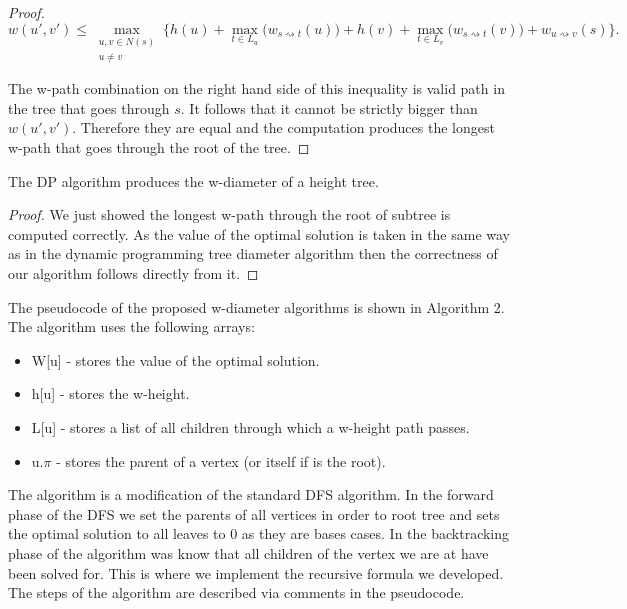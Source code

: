 \begin{proof}
   $$ w(u', v') \le \max\limits_{\substack{u, v \in N(s) \\ u \ne v}}\{ h(u) + \max\limits_{t \in L_u}\Big(w_{s \rightsquigarrow t}(u)\Big) + h(v) + \max\limits_{t \in L_v}\Big(w_{s \rightsquigarrow t}(v)\Big) + w_{u \rightsquigarrow v}(s)\}. $$

   The w-path combination on the right hand side of this inequality is valid path in the tree that goes through $s$. It follows that it cannot be strictly bigger than $w(u', v')$. Therefore they are equal and the computation produces the longest w-path that goes through the root of the tree.

   \end{proof}

\begin{lem} The DP algorithm produces the w-diameter of a height tree. \end{lem}

\begin{proof}

   We just showed the longest w-path through the root of subtree is computed correctly. As the value of the optimal solution is taken in the same way as in the dynamic programming tree diameter algorithm then the correctness of our algorithm follows directly from it.

\end{proof}

The pseudocode of the proposed w-diameter algorithms is shown in Algorithm 2. The algorithm uses the following arrays:

\begin{itemize}
    \item W[u] - stores the value of the optimal solution.
    \item h[u] - stores the w-height.
    \item L[u] - stores a list of all children through which a w-height path passes.
    \item u.$\pi$ - stores the parent of a vertex (or itself if is the root).
\end{itemize}

The algorithm is a modification of the standard DFS algorithm. In the forward phase of the DFS we set the parents of all vertices in order to root tree and sets the optimal solution to all leaves to 0 as they are bases cases. In the backtracking phase of the algorithm was know that all children of the vertex we are at have been solved for. This is where we implement the recursive formula we developed. The steps of the algorithm are described via comments in the pseudocode.

